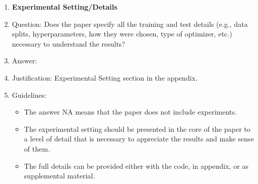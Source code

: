 \documentclass{article}
\begin{document}
\begin{enumerate}
\item {\bf Experimental Setting/Details}
    \item[] Question: Does the paper specify all the training and test details (e.g., data splits, hyperparameters, how they were chosen, type of optimizer, etc.) necessary to understand the results?
    \item[] Answer: \answerYes{} %
    \item[] Justification: Experimental Setting section in the appendix.
    \item[] Guidelines:
    \begin{itemize}
        \item The answer NA means that the paper does not include experiments.
        \item The experimental setting should be presented in the core of the paper to a level of detail that is necessary to appreciate the results and make sense of them.
        \item The full details can be provided either with the code, in appendix, or as supplemental material.
    \end{itemize}


\end{enumerate}
\end{document}
